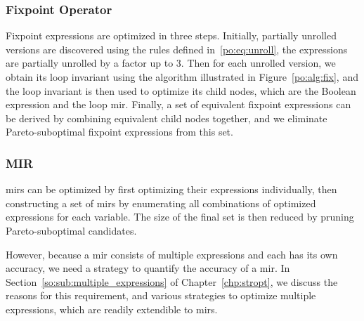 \subsubsection{Fixpoint Operator}

Fixpoint expressions are optimized in three steps.  Initially,
partially unrolled versions are discovered using the rules defined
in~\eqref{po:eq:unroll}, the expressions are partially unrolled by a factor up
to $3$.  Then for each unrolled version, we obtain its loop invariant using
the algorithm illustrated in Figure~\ref{po:alg:fix}, and the loop invariant
is then used to optimize its child nodes, which are the Boolean expression
and the loop \gls{mir}\@.  Finally, a set of equivalent fixpoint expressions
can be derived by combining equivalent child nodes together, and we eliminate
Pareto-suboptimal fixpoint expressions from this set.

\subsubsection{MIR}

\Glspl{mir} can be optimized by first optimizing their expressions
individually, then constructing a set of \glspl{mir} by enumerating all
combinations of optimized expressions for each variable.  The size of the final
set is then reduced by pruning Pareto-suboptimal candidates.

However, because a \gls{mir} consists of multiple expressions and each has its
own accuracy, we need a strategy to quantify the accuracy of a \gls{mir}\@.
In Section~\ref{so:sub:multiple_expressions} of Chapter~\ref{chp:stropt}, we
discuss the reasons for this requirement, and various strategies to optimize
multiple expressions, which are readily extendible to \glspl{mir}.
